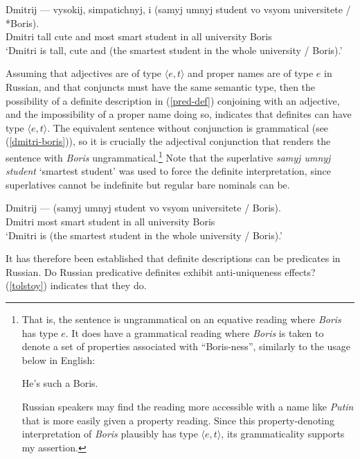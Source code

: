 \documentclass{article}
\begin{document}
\begin{exe}
	\ex \label{pred-def} \gll Dmitrij --- vysokij, simpatichnyj, i (samyj umnyj student vo vsyom universitete / *Boris).\\
	Dmitri {} tall cute and most smart student in all university {} Boris\\
	\glt `Dmitri is tall, cute and (the smartest student in the whole university / Boris).'
\end{exe}

Assuming that adjectives are of type $\langle e, t \rangle$ and proper names are of type $e$ in Russian, and that conjuncts must have the same semantic type, then the possibility of a definite description in (\ref{pred-def}) conjoining with an adjective, and the impossibility of a proper name doing so, indicates that definites can have type $\langle e, t \rangle$. The equivalent sentence without conjunction is grammatical (see (\ref{dmitri-boris})), so it is crucially the adjectival conjunction that renders the sentence with \textit{Boris} ungrammatical.\footnote{That is, the sentence is ungrammatical on an equative reading where \textit{Boris} has type $e$. It does have a grammatical reading where \textit{Boris} is taken to denote a set of properties associated with ``Boris-ness'', similarly to the usage below in English: \begin{exe} \ex He's such a Boris.\end{exe} Russian speakers may find the reading more accessible with a name like \textit{Putin} that is more easily given a property reading. Since this property-denoting interpretation of \textit{Boris} plausibly has type $\langle e, t \rangle$, its grammaticality supports my assertion.} Note that the superlative \textit{samyj umnyj student} `smartest student' was used to force the definite interpretation, since superlatives cannot be indefinite but regular bare nominals can be.

\begin{exe}
	\ex \label{dmitri-boris} \gll Dmitrij --- (samyj umnyj student vo vsyom universitete / Boris).\\
	Dmitri {} most smart student in all university {} Boris\\
	\glt `Dmitri is (the smartest student in the whole university / Boris).'
\end{exe}

It has therefore been established that definite descriptions can be predicates in Russian. Do Russian predicative definites exhibit anti-uniqueness effects? (\ref{tolstoy}) indicates that they do.
\end{document}
